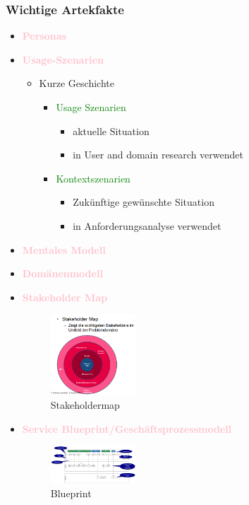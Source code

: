 \documentclass[../ZF_SWEN1.tex]{subfiles}
\begin{document}
\subsubsection{Wichtige Artekfakte}
\begin{itemize}
	\item \textcolor{pink}{\textbf{Personas}}
	\item \textcolor{pink}{\textbf{Usage-Szenarien}}
	\begin{itemize}
		\item Kurze Geschichte
		\begin{itemize}
			\item \textcolor{green} {Usage Szenarien}
			\begin{itemize}
				\item aktuelle Situation
				\item in User and domain research verwendet
			\end{itemize}
			\item \textcolor{green} {Kontextszenarien}
			\begin{itemize}
				\item Zukünftige gewünschte Situation
				\item in Anforderungsanalyse verwendet
			\end{itemize}
		\end{itemize}
		
	\end{itemize}
	\item \textcolor{pink}{\textbf{Mentales Modell}}
	\item \textcolor{pink}{\textbf{Domänenmodell}}
	\item \textcolor{pink}{\textbf{Stakeholder Map}}
	\begin{figure}[H]
	\centering
	\includegraphics[width=0.3\textwidth]{Resources/Images/Stakeholdermap.png}
	\caption{\label{fig:Stakeholdermap} Stakeholdermap}
	\end{figure}
	\item \textcolor{pink}{\textbf{Service Blueprint/Geschäftsprozessmodell}}
	\begin{figure}[H]
	\centering
	\includegraphics[width=0.3\textwidth] {Resources/Images/Blueprint.png}
	\caption{\label{fig:Blueprint}Blueprint}
	\end{figure}
	
\end{itemize}
\end{document}
